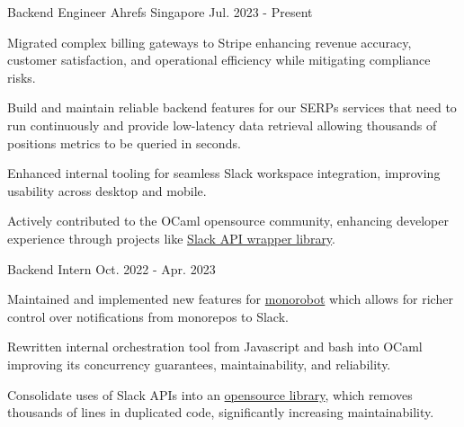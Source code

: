 

\begin{cventries}
  \cventrytwo
    {Backend Engineer} %
    {Ahrefs} %
    {Singapore} %
    {Jul. 2023 - Present} %
    {
      \begin{cvitems} %
        \item {Migrated complex billing gateways to Stripe enhancing revenue accuracy, customer satisfaction, and operational efficiency while mitigating compliance risks.}
        \item {Build and maintain reliable backend features for our SERPs services that need to run continuously and provide low-latency data retrieval allowing thousands of positions metrics to be queried in seconds.} %
        \item {Enhanced internal tooling for seamless Slack workspace integration, improving usability across desktop and mobile.}
        \item {Actively contributed to the OCaml opensource community, enhancing developer experience through projects like \href{https://github.com/ahrefs/slack}{Slack API wrapper library}.}
      \end{cvitems}
    }
    {Backend Intern} %
    {Oct. 2022 - Apr. 2023} %
    {
      \begin{cvitems} %
        \item {Maintained and implemented new features for \href{https://github.com/ahrefs/monorobot}{monorobot} which allows for richer control over notifications from monorepos to Slack.}
        \item {Rewritten internal orchestration tool from Javascript and bash into OCaml improving its concurrency guarantees, maintainability, and reliability.}
        \item {Consolidate uses of Slack APIs into an \href{https://github.com/ahrefs/slack}{opensource library}, which removes thousands of lines in duplicated code, significantly increasing maintainability.}
      \end{cvitems}
    }


\end{cventries}
